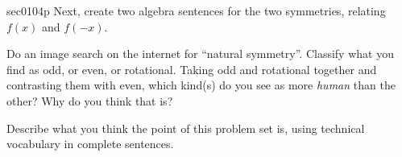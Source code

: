 \begin{multicols*}{2}
\begin{exercises}{sec0104p}
\lab{}Next, create two algebra sentences for the two symmetries, relating $f(x)$
and $f(-x)$.

\vspace{2cm}

\lab{}Do an image search on the internet for ``natural symmetry''.  Classify what you find as odd, or
even, or rotational.  Taking odd and rotational together and contrasting them with even, 
which kind(s) do you see as more \textit{human} than the other?  Why do you think that is?


\vspace{5cm}
\lab{}Describe what you think the point of this problem set is, using technical vocabulary in complete
sentences.
\end{exercises}
\end{multicols*}
